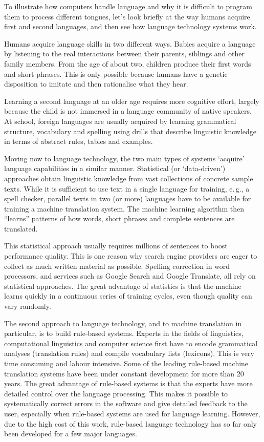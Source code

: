\begin{multicols}{2}
To illustrate how computers handle language and why it is difficult to program them to process different tongues, let’s look briefly at the way humans acquire first and second languages, and then see how language technology systems work.

Humans acquire language skills in two different ways. Babies acquire a language by listening to the real interactions between their parents, siblings and other family members. From the age of about two, children produce their first words and short phrases. This is only possible because humans have a genetic disposition to imitate and then rationalise what they hear. 

Learning a second language at an older age requires more cognitive effort, largely because the child is not immersed in a language community of native speakers. At school, foreign languages are usually acquired by learning grammatical structure, vocabulary and spelling using drills that describe linguistic knowledge in terms of abstract rules, tables and examples.


Moving now to language technology, the two main types of systems ‘acquire’ language capabilities in a similar manner. Statistical (or ‘data-driven’) approaches obtain linguistic knowledge from vast collections of concrete sample texts. While it is sufficient to use text in a single language for training, e.\,g., a spell checker, parallel texts in two (or more) languages have to be available for training a machine translation system. The machine learning algorithm then “learns” patterns of how words, short phrases and complete sentences are translated. 

This statistical approach usually requires millions of sentences to boost performance quality. This is one reason why search engine providers are eager to collect as much written material as possible. Spelling correction in word processors, and services such as Google Search and Google Translate, all rely on statistical approaches. The great advantage of statistics is that the machine learns quickly in a continuous series of training cycles, even though quality can vary randomly.

The second approach to language technology, and to machine translation in particular, is to build rule-based systems. Experts in the fields of linguistics, computational linguistics and computer science first have to encode grammatical analyses (translation rules) and compile vocabulary lists (lexicons). This is very time consuming and labour intensive. Some of the leading rule-based machine translation systems have been under constant development for more than 20 years. The great advantage of rule-based systems is that the experts have more detailed control over the language processing. This makes it possible to systematically correct errors in the software and give detailed feedback to the user, especially when rule-based systems are used for language learning. However, due to the high cost of this work, rule-based language technology has so far only been developed for a few major languages. 


\end{multicols}
